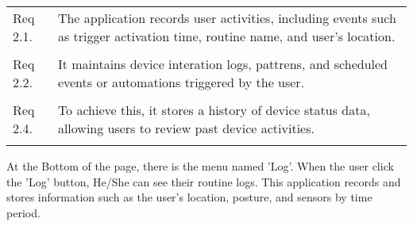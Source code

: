 \begin{enumerate}[label=\arabic*.]
\begin{enumerate}[label*={\arabic*.},ref=\theenumi.\arabic*]
\begin{table}[H]
\begin{tabular}{m{1.4cm} m{5.5cm}}
                            \midrule
                            Req 2.1.   & The application records user activities, including events such as trigger activation time, routine name, and user's location. \\\\
                            Req 2.2.   & It maintains device interation logs, pattrens, and scheduled events or automations triggered by the user.                     \\\\
                            Req 2.4.   & To achieve this, it stores a history of device status data, allowing users to review past device activities.                  \\\\
                            \bottomrule
                        \end{tabular}
                    \end{table}

                    At the Bottom of the page, there is the menu named 'Log'. When the user click the 'Log' button, He/She can see their routine logs. This application records and stores information such as the user's location, posture, and sensors by time period. \\

          \end{enumerate}


\end{enumerate}
